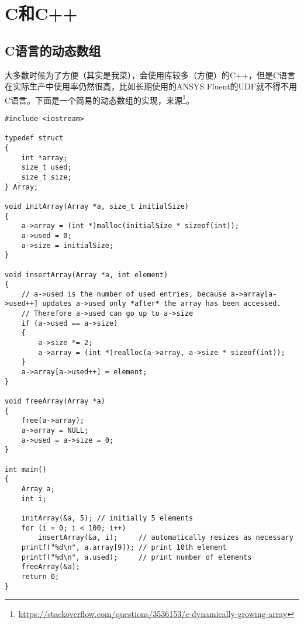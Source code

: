 \chapter{C和C++}

\section{C语言的动态数组}

大多数时候为了方便（其实是我菜），会使用库较多（方便）的C++，但是C语言在实际生产中使用率仍然很高，比如长期使用的ANSYS Fluent的UDF就不得不用C语言。下面是一个简易的动态数组的实现，来源\footnote{\url{https://stackoverflow.com/questions/3536153/c-dynamically-growing-array}}。

\begin{verbatim}
#include <iostream>

typedef struct
{
    int *array;
    size_t used;
    size_t size;
} Array;

void initArray(Array *a, size_t initialSize)
{
    a->array = (int *)malloc(initialSize * sizeof(int));
    a->used = 0;
    a->size = initialSize;
}

void insertArray(Array *a, int element)
{
    // a->used is the number of used entries, because a->array[a->used++] updates a->used only *after* the array has been accessed.
    // Therefore a->used can go up to a->size
    if (a->used == a->size)
    {
        a->size *= 2;
        a->array = (int *)realloc(a->array, a->size * sizeof(int));
    }
    a->array[a->used++] = element;
}

void freeArray(Array *a)
{
    free(a->array);
    a->array = NULL;
    a->used = a->size = 0;
}

int main()
{
    Array a;
    int i;

    initArray(&a, 5); // initially 5 elements
    for (i = 0; i < 100; i++)
        insertArray(&a, i);     // automatically resizes as necessary
    printf("%d\n", a.array[9]); // print 10th element
    printf("%d\n", a.used);     // print number of elements
    freeArray(&a);
    return 0;
}

\end{verbatim}